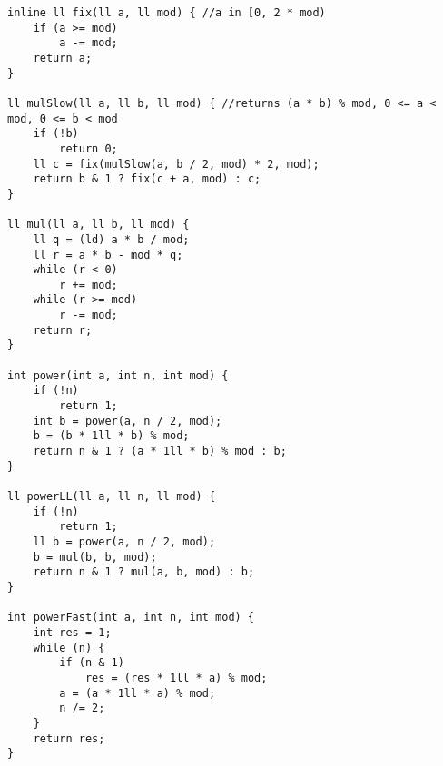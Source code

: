 \begin{verbatim}
inline ll fix(ll a, ll mod) { //a in [0, 2 * mod)
 	if (a >= mod)
 		a -= mod;
 	return a;
}

ll mulSlow(ll a, ll b, ll mod) { //returns (a * b) % mod, 0 <= a < mod, 0 <= b < mod
	if (!b)
		return 0;
	ll c = fix(mulSlow(a, b / 2, mod) * 2, mod);
	return b & 1 ? fix(c + a, mod) : c;
}

ll mul(ll a, ll b, ll mod) {
	ll q = (ld) a * b / mod;
	ll r = a * b - mod * q;
	while (r < 0)
		r += mod;
	while (r >= mod)
		r -= mod;
	return r;
}

int power(int a, int n, int mod) {
	if (!n) 
		return 1;
	int b = power(a, n / 2, mod);
	b = (b * 1ll * b) % mod;
	return n & 1 ? (a * 1ll * b) % mod : b; 
}

ll powerLL(ll a, ll n, ll mod) {
	if (!n) 
		return 1;
	ll b = power(a, n / 2, mod);
	b = mul(b, b, mod);
	return n & 1 ? mul(a, b, mod) : b; 
}

int powerFast(int a, int n, int mod) {
	int res = 1;
	while (n) {
		if (n & 1)
			res = (res * 1ll * a) % mod;
		a = (a * 1ll * a) % mod;
		n /= 2;
	}
	return res;
}
\end{verbatim}
   
